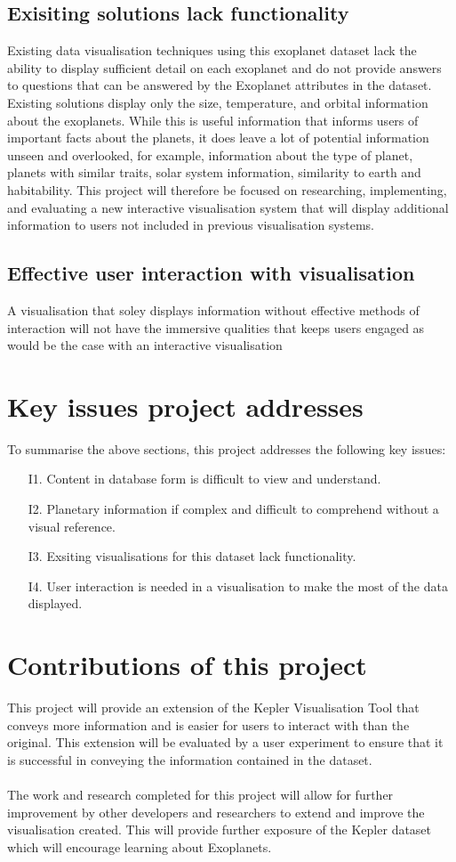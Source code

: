 \subsection{Exisiting solutions lack functionality}
Existing data visualisation techniques using this exoplanet dataset lack the ability to display sufficient detail on each exoplanet and do not provide answers to questions that can be answered by the Exoplanet attributes in the dataset. Existing solutions display only the size, temperature, and orbital information about the exoplanets. While this is useful information that informs users of important facts about the planets, it does leave a lot of potential information unseen and overlooked, for example, information about the type of planet, planets with similar traits, solar system information, similarity to earth and habitability. This project will therefore be focused on researching, implementing, and evaluating a new interactive visualisation system that will display additional information to users not included in previous visualisation systems.

\subsection{Effective user interaction with visualisation}
A visualisation that soley displays information without effective methods of interaction will not have the immersive qualities that keeps users engaged as would be the case with an interactive visualisation
\section{Key issues project addresses}
To summarise the above sections, this project addresses the following key issues:
\begin{enumerate}
 \item[I1.] Content in database form is difficult to view and understand.
 \item[I2.] Planetary information if complex and difficult to comprehend without a visual reference.
 \item[I3.] Exsiting visualisations for this dataset lack functionality.
 \item[I4.] User interaction is needed in a visualisation to make the most of the data displayed.
\end{enumerate}

\section{Contributions of this project}
This project will provide an extension of the Kepler Visualisation Tool \cite{kepler_github} that conveys more information and is easier for users to interact with than the original. This extension will be evaluated by a user experiment to ensure that it is successful in conveying the information contained in the dataset.
\\\\
The work and research completed for this project will allow for further improvement by other developers and researchers to extend and improve the visualisation created. This will provide further exposure of the Kepler dataset which will encourage learning about Exoplanets.
